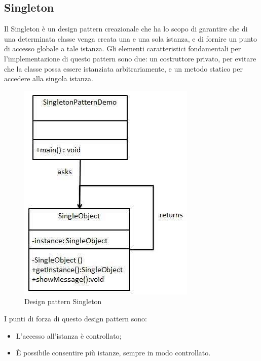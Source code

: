 \subsection{Singleton}
Il Singleton è un design pattern creazionale che ha lo scopo di garantire che di una determinata classe venga creata una e una sola istanza, e di fornire un punto di accesso globale a tale istanza.
Gli elementi caratteristici fondamentali per l'implementazione di questo pattern sono due: un costruttore privato, per evitare che la classe possa essere istanziata arbitrariamente, e un metodo statico per accedere alla singola istanza.
\begin{figure}[H]
	\centering
	\includegraphics[width=0.4\linewidth]{IMG/singleton_pattern}
	\caption{Design pattern Singleton}
\end{figure}

I punti di forza di questo design pattern sono:
\begin{itemize}
	\item L'accesso all'istanza è controllato;
	\item \MakeUppercase{è} possibile consentire più istanze, sempre in modo controllato.
\end{itemize}

